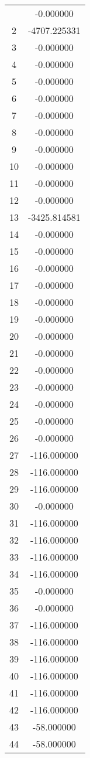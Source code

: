\documentclass[12pt]{article}
\begin{document}
\begin{longtable}{@{}cc@{}}
\bottomrule
\endlastfoot
1 & -0.000000 \\
2 & -4707.225331 \\
3 & -0.000000 \\
4 & -0.000000 \\
5 & -0.000000 \\
6 & -0.000000 \\
7 & -0.000000 \\
8 & -0.000000 \\
9 & -0.000000 \\
10 & -0.000000 \\
11 & -0.000000 \\
12 & -0.000000 \\
13 & -3425.814581 \\
14 & -0.000000 \\
15 & -0.000000 \\
16 & -0.000000 \\
17 & -0.000000 \\
18 & -0.000000 \\
19 & -0.000000 \\
20 & -0.000000 \\
21 & -0.000000 \\
22 & -0.000000 \\
23 & -0.000000 \\
24 & -0.000000 \\
25 & -0.000000 \\
26 & -0.000000 \\
27 & -116.000000 \\
28 & -116.000000 \\
29 & -116.000000 \\
30 & -0.000000 \\
31 & -116.000000 \\
32 & -116.000000 \\
33 & -116.000000 \\
34 & -116.000000 \\
35 & -0.000000 \\
36 & -0.000000 \\
37 & -116.000000 \\
38 & -116.000000 \\
39 & -116.000000 \\
40 & -116.000000 \\
41 & -116.000000 \\
42 & -116.000000 \\
43 & -58.000000 \\
44 & -58.000000 \\

\end{longtable}
\end{document}
